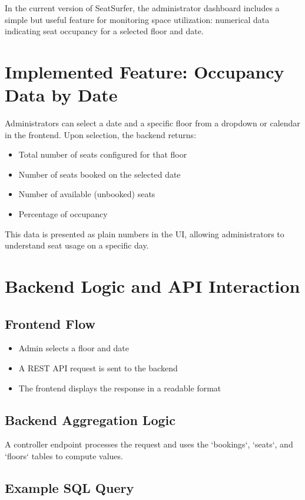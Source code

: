 \documentclass[12pt,a4paper]{report}
\begin{document}
In the current version of SeatSurfer, the administrator dashboard includes a simple but useful feature for monitoring space utilization: numerical data indicating seat occupancy for a selected floor and date.

\section{Implemented Feature: Occupancy Data by Date}

Administrators can select a date and a specific floor from a dropdown or calendar in the frontend. Upon selection, the backend returns:
\begin{itemize}
    \item Total number of seats configured for that floor
    \item Number of seats booked on the selected date
    \item Number of available (unbooked) seats
    \item Percentage of occupancy
\end{itemize}

This data is presented as plain numbers in the UI, allowing administrators to understand seat usage on a specific day.

\section{Backend Logic and API Interaction}

\subsection*{Frontend Flow}
\begin{itemize}
    \item Admin selects a floor and date
    \item A REST API request is sent to the backend
    \item The frontend displays the response in a readable format
\end{itemize}

\subsection*{Backend Aggregation Logic}
A controller endpoint processes the request and uses the `bookings`, `seats`, and `floors` tables to compute values.

\subsection*{Example SQL Query}
\end{document}
